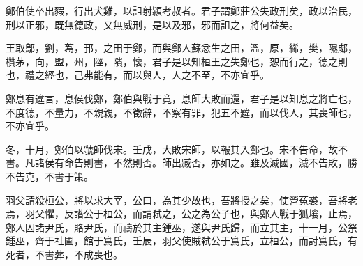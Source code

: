 \begin{pinyinscope}
鄭伯使卒出豭，行出犬雞，以詛射潁考叔者。君子謂鄭莊公失政刑矣，政以治民，刑以正邪，既無德政，又無威刑，是以及邪，邪而詛之，將何益矣。

王取鄔，劉，蒍，邘，之田于鄭，而與鄭人蘇忿生之田，溫，原，絺，樊，隰郕，欑茅，向，盟，州，陘，隤，懷，君子是以知桓王之失鄭也，恕而行之，德之則也，禮之經也，己弗能有，而以與人，人之不至，不亦宜乎。

鄭息有違言，息侯伐鄭，鄭伯與戰于竟，息師大敗而還，君子是以知息之將亡也，不度德，不量力，不親親，不徵辭，不察有罪，犯五不韙，而以伐人，其喪師也，不亦宜乎。

冬，十月，鄭伯以虢師伐宋。壬戌，大敗宋師，以報其入鄭也。宋不告命，故不書。凡諸侯有命告則書，不然則否。師出臧否，亦如之。雖及滅國，滅不告敗，勝不告克，不書于策。

羽父請殺桓公，將以求大宰，公曰，為其少故也，吾將授之矣，使營菟裘，吾將老焉，羽父懼，反譖公于桓公，而請弒之，公之為公子也，與鄭人戰于狐壤，止焉，鄭人囚諸尹氏，賂尹氏，而禱於其主鍾巫，遂與尹氏歸，而立其主，十一月，公祭鍾巫，齊于社圃，館于寪氏，壬辰，羽父使賊弒公于寪氏，立桓公，而討寪氏，有死者，不書葬，不成喪也。


\end{pinyinscope}